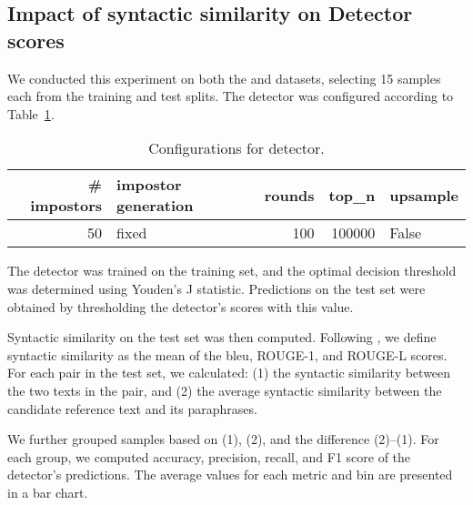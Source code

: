 \subsection{Impact of syntactic similarity on \imp{} Detector scores}
\label{sec:syn_sim_impact_}

We conducted this experiment on both the \dataBlog{} and \dataStudent{} datasets, selecting 15 samples each from the training and test splits. 
The detector was configured according to Table~\ref{tab:imp_syn_sim_config}.

\begin{table}[h]
\centering\small
\caption{Configurations for detector.}
\label{tab:imp_syn_sim_config}
\begin{tabular}{@{}rlrrl@{}}   %
\toprule
\# impostors & impostor generation & rounds & top\_n & upsample \\
\midrule
50 & fixed & 100 & \num{100000} & False \\
\bottomrule
\end{tabular}%
\end{table}

The detector was trained on the training set, and the optimal decision threshold was determined using Youden’s J statistic. 
Predictions on the test set were obtained by thresholding the detector’s scores with this value.

Syntactic similarity on the test set was then computed. 
Following \citet{gohsen_captions_2023}, we define syntactic similarity as the mean of the  \ac{bleu}, ROUGE-1, and ROUGE-L scores. 
For each pair in the test set, we calculated:
(1) the syntactic similarity between the two texts in the pair, and (2) the average syntactic similarity between the candidate reference text and its paraphrases.

We further grouped samples based on (1), (2), and the difference (2)–(1). 
For each group, we computed accuracy, precision, recall, and F1 score of the detector’s predictions. 
The average values for each metric and bin are presented in a bar chart.
